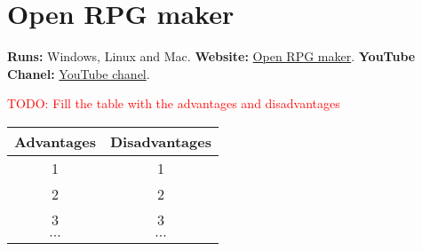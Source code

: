\documentclass{article}
\begin{document}
\section{Open RPG maker}

\textbf{Runs:} Windows, Linux and Mac.
\textbf{Website:} \href{https://openrpgmaker.sourceforge.net}{Open RPG maker}.
\textbf{YouTube Chanel:} \href{https://www.youtube.com/@openrpgmaker8158}{YouTube chanel}.

\textcolor{red}{TODO: Fill the table with the advantages and disadvantages} 

\begin{center}
\begin{tabular}{ |c|c| } 
  \hline
  Advantages & Disadvantages\\ 
  \hline
  1 & 1\\ 
  \hline
  2 & 2\\
  \hline
  3 & 3\\
  \hline
  $\cdots$ & $\cdots$\\
  \hline
\end{tabular}
\end{center}
\end{document}
